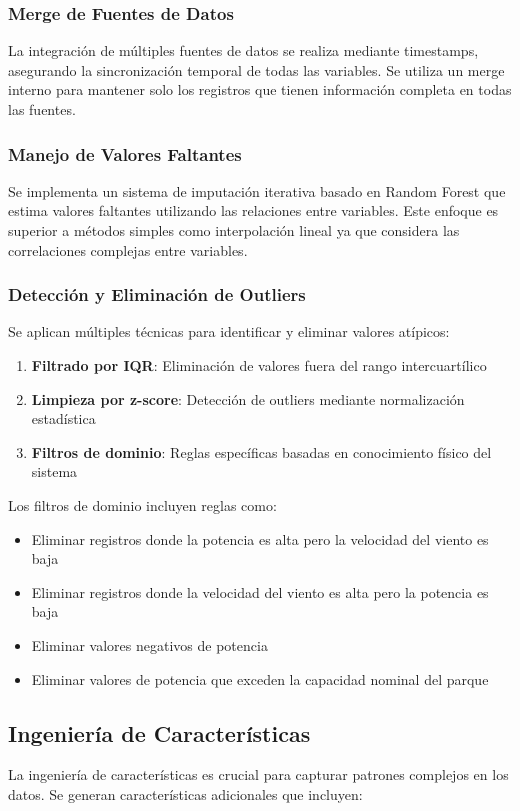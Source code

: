 \documentclass[conference]{IEEEtran}
\begin{document}
	\subsubsection{Merge de Fuentes de Datos}
	La integración de múltiples fuentes de datos se realiza mediante timestamps, asegurando la sincronización temporal de todas las variables. Se utiliza un merge interno para mantener solo los registros que tienen información completa en todas las fuentes.
	
	\subsubsection{Manejo de Valores Faltantes}
	Se implementa un sistema de imputación iterativa basado en Random Forest que estima valores faltantes utilizando las relaciones entre variables. Este enfoque es superior a métodos simples como interpolación lineal ya que considera las correlaciones complejas entre variables.
	
	\subsubsection{Detección y Eliminación de Outliers}
	Se aplican múltiples técnicas para identificar y eliminar valores atípicos:
	\begin{enumerate}
		\item \textbf{Filtrado por IQR}: Eliminación de valores fuera del rango intercuartílico
		\item \textbf{Limpieza por z-score}: Detección de outliers mediante normalización estadística
		\item \textbf{Filtros de dominio}: Reglas específicas basadas en conocimiento físico del sistema
	\end{enumerate}
	
	Los filtros de dominio incluyen reglas como:
	\begin{itemize}
		\item Eliminar registros donde la potencia es alta pero la velocidad del viento es baja
		\item Eliminar registros donde la velocidad del viento es alta pero la potencia es baja
		\item Eliminar valores negativos de potencia
		\item Eliminar valores de potencia que exceden la capacidad nominal del parque
	\end{itemize}
	
	\subsection{Ingeniería de Características}
	La ingeniería de características es crucial para capturar patrones complejos en los datos. Se generan características adicionales que incluyen:
	
\end{document}

